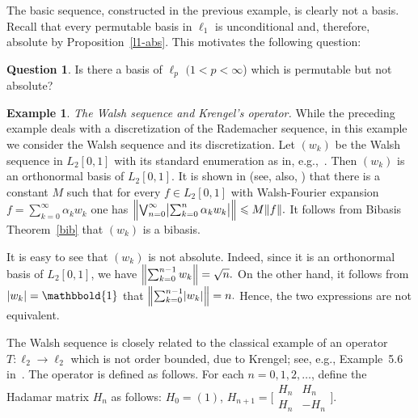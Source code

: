\documentclass[12pt]{amsart}
\theoremstyle{plain}
\theoremstyle{definition}
\newtheorem{question}[theorem]{Question}
\newtheorem{example}[theorem]{Example}
\newcommand{\abs}[1]{\lvert#1\rvert}
\newcommand{\norm}[1]{\lVert#1\rVert}
\newcommand{\bigabs}[1]{\bigl\lvert#1\bigr\rvert}
\newcommand{\Bignorm}[1]{\Bigl\lVert#1\Bigr\rVert}
\def\one{\mathbbold{1}}
\renewcommand{\le}{\leqslant}
\begin{document}
The basic sequence, constructed in the previous example, is clearly not
a basis. Recall that every permutable basis in $\ell_1$ is
unconditional and, therefore, absolute by
Proposition~\ref{l1-abs}. This motivates the following question:

\begin{question}
  Is there a basis of $\ell_p$ $(1<p<\infty$) which is permutable but
  not absolute?
\end{question}

\begin{example}
  \emph{The Walsh sequence and Krengel's operator.} While the preceding
  example deals with a discretization of the Rademacher sequence, in this
  example we consider the Walsh sequence and its discretization. Let
  $(w_k)$ be the Walsh sequence in $L_2[0,1]$ with its standard
  enumeration as in, e.g.,~\cite{Wade:82}. Then $(w_k)$ is an
  orthonormal basis of $L_2[0,1]$. It is shown in \cite{Hunt:70} (see,
  also, \cite[p.~631]{Wade:82}) that there is a constant $M$ such that
  for every $f\in L_2[0,1]$ with Walsh-Fourier expansion
  $f=\sum_{k=0}^\infty\alpha_kw_k$ one has
  \begin{math}
    \Bignorm{\bigvee_{n=0}^\infty\bigabs{\sum_{k=0}^n
        \alpha_kw_k}}\le M\norm{f}.
  \end{math}
  It follows from Bibasis Theorem~\ref{bib} that $(w_k)$ is a
  bibasis.

  It is easy to see that $(w_k)$ is not absolute. Indeed, since it is
  an orthonormal basis of $L_2[0,1]$, we have
  \begin{math}
    \Bignorm{\sum_{k=0}^{n-1}w_k}=\sqrt{n}.
  \end{math}
  On the other hand, it follows from $\abs{w_k}=\one$ that
  \begin{math}
    \Bignorm{\sum_{k=0}^{n-1}\abs{w_k}}=n.
  \end{math}
  Hence, the two expressions are not equivalent.

  The Walsh sequence is closely related to the classical example of an
  operator $T\colon\ell_2\to\ell_2$ which is not order bounded, due to
  Krengel; see, e.g., Example~5.6 in~\cite{Aliprantis:06}. The
  operator is defined as follows.  For each $n=0,1,2,\dots$, define
  the Hadamar matrix $H_n$ as follows: $H_0=(1)$,
  \begin{math}
    H_{n+1}=\bigl[
    \begin{smallmatrix}
      H_n & H_n\\
     H_n & -H_n
    \end{smallmatrix}
    \bigr].
  \end{math}


\end{example}
\end{document}
